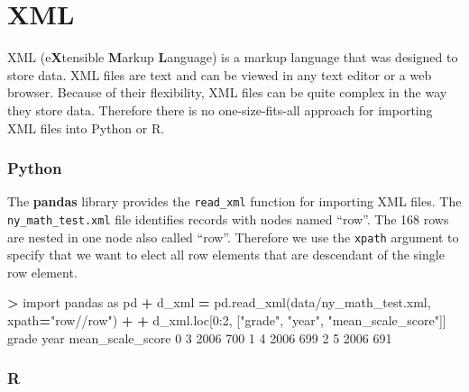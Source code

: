 \documentclass[
]{book}
\newenvironment{Shaded}{\begin{snugshade}}{\end{snugshade}}
\newcommand{\DecValTok}[1]{\textcolor[rgb]{0.00,0.00,0.81}{#1}}
\newcommand{\ImportTok}[1]{#1}
\newcommand{\NormalTok}[1]{#1}
\newcommand{\OperatorTok}[1]{\textcolor[rgb]{0.81,0.36,0.00}{\textbf{#1}}}
\newcommand{\StringTok}[1]{\textcolor[rgb]{0.31,0.60,0.02}{#1}}
\begin{document}
\hypertarget{xml}{%
\section{XML}\label{xml}}

XML (e\textbf{X}tensible \textbf{M}arkup \textbf{L}anguage) is a markup language that was designed to store data. XML files are text and can be viewed in any text editor or a web browser. Because of their flexibility, XML files can be quite complex in the way they store data. Therefore there is no one-size-fits-all approach for importing XML files into Python or R.

\hypertarget{python-15}{%
\subsubsection*{Python}\label{python-15}}

The \textbf{pandas} library provides the \texttt{read\_xml} function for importing XML files. The \texttt{ny\_math\_test.xml} file identifies records with nodes named ``row''. The 168 rows are nested in one node also called ``row''. Therefore we use the \texttt{xpath} argument to specify that we want to elect all row elements that are descendant of the single row element.

\begin{Shaded}
\begin{Highlighting}[]
\OperatorTok{\textgreater{}} \ImportTok{import}\NormalTok{ pandas }\ImportTok{as}\NormalTok{ pd}
\OperatorTok{+}\NormalTok{ d\_xml }\OperatorTok{=}\NormalTok{ pd.read\_xml(}\StringTok{\textquotesingle{}data/ny\_math\_test.xml\textquotesingle{}}\NormalTok{, xpath}\OperatorTok{=}\StringTok{"row//row"}\NormalTok{)}
\OperatorTok{+} 
\OperatorTok{+}\NormalTok{ d\_xml.loc[}\DecValTok{0}\NormalTok{:}\DecValTok{2}\NormalTok{, [}\StringTok{"grade"}\NormalTok{, }\StringTok{"year"}\NormalTok{, }\StringTok{"mean\_scale\_score"}\NormalTok{]]  }
\NormalTok{  grade  year  mean\_scale\_score}
\DecValTok{0}     \DecValTok{3}  \DecValTok{2006}               \DecValTok{700}
\DecValTok{1}     \DecValTok{4}  \DecValTok{2006}               \DecValTok{699}
\DecValTok{2}     \DecValTok{5}  \DecValTok{2006}               \DecValTok{691}
\end{Highlighting}
\end{Shaded}

\hypertarget{r-15}{%
\subsubsection*{R}\label{r-15}}
\end{document}
